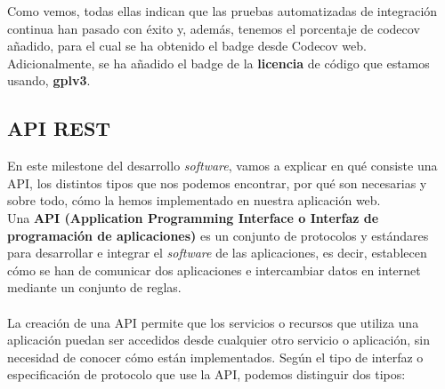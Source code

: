 Como vemos, todas ellas indican que las pruebas automatizadas de integración continua han
pasado con éxito y, además, tenemos el porcentaje de codecov añadido, para el cual se ha
obtenido el badge desde Codecov web. Adicionalmente, se ha añadido el badge de la
\textbf{licencia} de código que estamos usando, \textbf{gplv3}.

\subsection{API REST}
En este milestone del desarrollo \textit{software}, vamos a explicar en qué consiste una
API, los distintos tipos que nos podemos encontrar, por qué son necesarias y sobre todo,
cómo la hemos implementado en nuestra aplicación web.\\

Una \textbf{API \cite{api} (Application Programming Interface o Interfaz de programación
de aplicaciones)} es un conjunto de protocolos y estándares para desarrollar e integrar el
\textit{software} de las aplicaciones, es decir, establecen cómo se han de comunicar dos
aplicaciones e intercambiar datos en internet mediante un conjunto de reglas.\\ \\

La creación de una API permite que los servicios o recursos que utiliza una aplicación
puedan ser accedidos desde cualquier otro servicio o aplicación, sin necesidad de
conocer cómo están implementados. Según el tipo de interfaz o especificación de protocolo
que use la API, podemos distinguir dos tipos:

